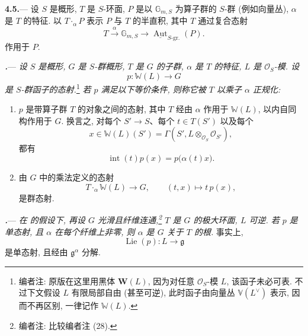 \par\medskip\noindent
\textbf{4.5.}---
设 \(S\) 是概形, \(T\) 是 \(S\)-环面, \(P\) 是以 \(\mathbb G_{m,S}\) 为算子群的 \(S\)-群 \textup{(例如向量丛)}, \(\alpha\) 是 \(T\) 的特征. 以 \(T\mathbin{\cdot_\alpha}P\) 表示 \(P\) 与 \(T\) 的半直积, 其中 \(T\) 通过复合态射
\[
  T
  \xrightarrow{\ \alpha\ }
  \mathbb G_{m,S}
  \longrightarrow
  \underline{\operatorname{Aut}}_{S\text{-gr.}}(P).
\]
作用于 \(P\).

\par\medskip\noindent
{}\textbf{\textit{.}}---
\textit{设 \(S\) 是概形, \(G\) 是 \(S\)-群概形, \(T\) 是 \(G\) 的子群, \(\alpha\) 是 \(T\) 的特征, \(L\) 是 \(\mathcal O_S\)-模. 设}
\[
  p\colon\mathbb W(L)\longrightarrow G
\]
\textit{是 \(S\)-群函子的态射.}\footnote{编者注: 原版在这里用黑体 \(\mathbf W(L)\), 因为对任意 \(\mathcal O_S\)-模 \(L\), 该函子未必可表. 不过下文假设 \(L\) 有限局部自由 \textup{(甚至可逆)}, 此时函子由向量丛 \(\mathbb V(L^\vee)\) 表示, 因而不再区别, 一律记作 \(\mathbb W(L)\).}
\textit{若 \(p\) 满足以下等价条件, 则称它\emph{被 \(T\) 以乘子 \(\alpha\) 正规化}:}
\begin{enumerate}
\item[\textup{(i)}]
\(p\) 是带算子群 \(T\) 的对象之间的态射, 其中 \(T\) 经由 \(\alpha\) 作用于 \(\mathbb W(L)\), 以内自同构作用于 \(G\). 换言之, 对每个 \(S'\to S\)、每个 \(t\in T(S')\) 以及每个
\[
  x\in\mathbb W(L)(S')
  =
  \Gamma(S',L\otimes_{\mathcal O_S}\mathcal O_{S'}),
\]
都有
\[
  \operatorname{int}(t)p(x)=p\bigl(\alpha(t)x\bigr).
\]
\item[\textup{(ii)}]
由 \(G\) 中的乘法定义的态射
\[
  T\mathbin{\cdot_\alpha}\mathbb W(L)\longrightarrow G,
  \qquad
  (t,x)\longmapsto t\,p(x),
\]
是群态射.
\end{enumerate}

\par\medskip\noindent
{}\textbf{\textit{.}}---
\textit{在  的假设下, 再设 \(G\) 光滑且纤维连通,\footnote{编者注: 比较编者注 \textup{(28)}.} \(T\) 是 \(G\) 的极大环面, \(L\) 可逆. 若 \(p\) 是单态射, 且 \(\alpha\) 在每个纤维上非零, 则 \(\alpha\) 是 \(G\) 关于 \(T\) 的根.}
事实上,
\[
  \operatorname{Lie}(p)\colon L\longrightarrow\mathfrak g
\]
是单态射, 且经由 \(\mathfrak g^\alpha\) 分解.

